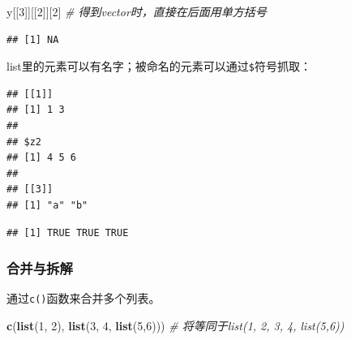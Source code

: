 \documentclass[]{book}
\newenvironment{Shaded}{\begin{snugshade}}{\end{snugshade}}
\newcommand{\CommentTok}[1]{\textcolor[rgb]{0.56,0.35,0.01}{\textit{#1}}}
\newcommand{\DataTypeTok}[1]{\textcolor[rgb]{0.13,0.29,0.53}{#1}}
\newcommand{\DecValTok}[1]{\textcolor[rgb]{0.00,0.00,0.81}{#1}}
\newcommand{\KeywordTok}[1]{\textcolor[rgb]{0.13,0.29,0.53}{\textbf{#1}}}
\newcommand{\NormalTok}[1]{#1}
\newcommand{\OperatorTok}[1]{\textcolor[rgb]{0.81,0.36,0.00}{\textbf{#1}}}
\newcommand{\StringTok}[1]{\textcolor[rgb]{0.31,0.60,0.02}{#1}}
\begin{document}
\begin{Shaded}
\begin{Highlighting}[]
\NormalTok{y[[}\DecValTok{3}\NormalTok{]][[}\DecValTok{2}\NormalTok{]][}\DecValTok{2}\NormalTok{] }\CommentTok{# 得到vector时，直接在后面用单方括号}
\end{Highlighting}
\end{Shaded}

\begin{verbatim}
## [1] NA
\end{verbatim}

list里的元素可以有名字；被命名的元素可以通过\texttt{\$}符号抓取：

\begin{Shaded}
\end{Shaded}

\begin{verbatim}
## [[1]]
## [1] 1 3
## 
## $z2
## [1] 4 5 6
## 
## [[3]]
## [1] "a" "b"
\end{verbatim}

\begin{Shaded}
\end{Shaded}

\begin{verbatim}
## [1] TRUE TRUE TRUE
\end{verbatim}

\hypertarget{list-combine-unlist}{%
\subsubsection{合并与拆解}\label{list-combine-unlist}}

通过\texttt{c()}函数来合并多个列表。

\begin{Shaded}
\begin{Highlighting}[]
\KeywordTok{c}\NormalTok{(}\KeywordTok{list}\NormalTok{(}\DecValTok{1}\NormalTok{, }\DecValTok{2}\NormalTok{), }\KeywordTok{list}\NormalTok{(}\DecValTok{3}\NormalTok{, }\DecValTok{4}\NormalTok{, }\KeywordTok{list}\NormalTok{(}\DecValTok{5}\NormalTok{,}\DecValTok{6}\NormalTok{)))}
\CommentTok{# 将等同于list(1, 2, 3, 4, list(5,6))}
\end{Highlighting}
\end{Shaded}
\end{document}
